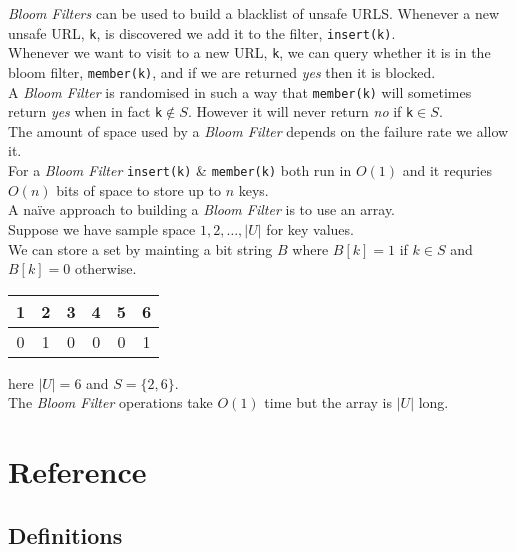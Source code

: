 \documentclass[11pt,a4paper]{article}
\begin{document}
\textit{Bloom Filters} can be used to build a blacklist of unsafe URLS. Whenever a new unsafe URL, \lstinline!k!, is discovered we add it to the filter, \lstinline!insert(k)!.\\
Whenever we want to visit to a new URL, \lstinline!k!, we can query whether it is in the bloom filter, \lstinline!member(k)!, and if we are returned \textit{yes} then it is blocked.\\

A \textit{Bloom Filter} is randomised in such a way that \lstinline!member(k)! will sometimes return \textit{yes} when in fact \lstinline!k!$\not\in S$. However it will never return \textit{no} if \lstinline!k!$\in S$.\\
\nb The amount of space used by a \textit{Bloom Filter} depends on the failure rate we allow it.\\

For a \textit{Bloom Filter} \lstinline!insert(k)! \& \lstinline!member(k)! both run in $O(1)$ and it requries $O(n)$ bits of space to store up to $n$ keys.\\

A na\"ive approach to building a \textit{Bloom Filter} is to use an array.\\
Suppose we have sample space $1,2,\dots,|U|$ for key values.\\
We can store a set by mainting a bit string $B$ where $B[k]=1$ if $k\in S$ and $B[k]=0$ otherwise.\\
\eg \begin{tabular}{|c|c|c|c|c|c|}
\hline
1&2&3&4&5&6\\\hline
0&1&0&0&0&1\\\hline
\end{tabular} here $|U|=6$ and $S=\{2,6\}$.\\
The \textit{Bloom Filter} operations take $O(1)$ time but the array is $|U|$ long.\\

\newpage
\setcounter{section}{-1}
\section{Reference}

\subsection{Definitions}
\end{document}
